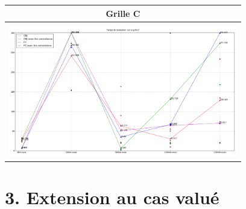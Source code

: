 \documentclass[a4paper,12pt]{report}
\begin{document}
\begin{enumerate}
\begin{table}[!h]
\begin{center}
\begin{tabular}{|c|}
\hline
Grille C \\
\hline
\\
\includegraphics[width=10cm]{Grille_C.png}\\

\hline

\end{tabular}
\end{center}
\end{table}

\end{enumerate}

\section*{3. Extension au cas valué}
\end{document}
